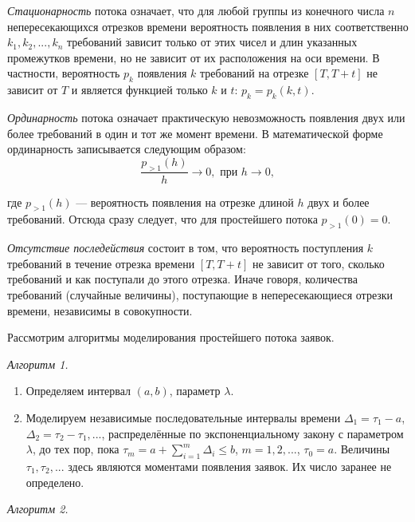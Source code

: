 \textit{Стационарность} потока означает, что для любой группы из конечного числа $n$
непересекающихся отрезков времени вероятность появления в них соответственно
$ k_1, k_2, ..., k_n $ требований зависит только от этих чисел и длин указанных
промежутков времени, но не зависит от их расположения на оси времени. В частности,
вероятность $p_k$ появления $k$ требований на отрезке $[T, T+t]$ не зависит от
$T$ и является функцией только $k$ и $t$: $p_k = p_k(k,t)$.

\textit{Ординарность} потока означает практическую невозможность появления двух или более
требований в один и тот же момент времени. В математической форме ординарность
записывается следующим образом:
\begin{equation}
  \dfrac{p_{>1}(h)}{h} \rightarrow 0, \text{  при } h \rightarrow 0,
\end{equation}
\par где $p_{>1}(h)$ --- вероятность появления на отрезке длиной $h$ двух и более
требований. Отсюда сразу следует, что для простейшего потока $p_{>1}(0) = 0$.

\textit{Отсутствие последействия} состоит в том, что вероятность поступления $k$
требований в течение отрезка времени $[T,T+t]$ не зависит от того, сколько требований
и как поступали до этого отрезка. Иначе говоря, количества требований (случайные
величины), поступающие в непересекающиеся отрезки времени, независимы в совокупности.

Рассмотрим алгоритмы моделирования простейшего потока заявок.

\textit{Алгоритм 1.}

\begin{enumerate}
  \item Определяем интервал $(a, b)$, параметр $\lambda$.
  \item Моделируем независимые последовательные интервалы времени $\Delta_1 =
    \tau_1 - a$, $\Delta_2 = \tau_2 - \tau_1, ...$, распределённые по
    экспоненциальному закону с параметром $\lambda$, до тех пор,
    пока $\tau_m = a + \sum\limits_{i=1}^{m}\Delta_i \le b $, $ m=1,2,... $, $\tau_0 = a$.
    Величины $\tau_1, \tau_2,... $ здесь являются моментами появления
    заявок. Их число заранее не определено.
\end{enumerate}

\textit{Алгоритм 2.}

